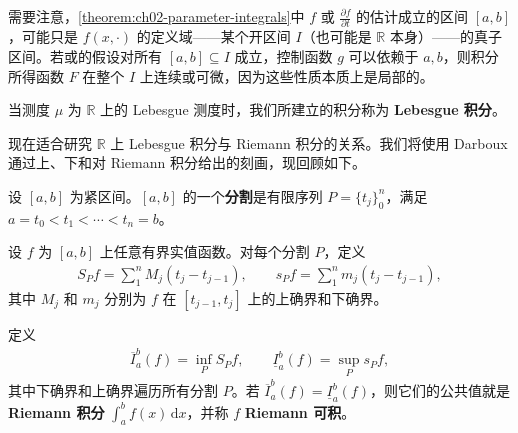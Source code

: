\documentclass[../../main.tex]{subfiles}%
\begin{document}
\begin{remark}
需要注意，\cref{theorem:ch02-parameter-integrals}中 $f$ 或 $\frac{\partial f}{\partial t}$ 的估计成立的区间 $[a,b]$，可能只是 $f(x,\cdot)$ 的定义域——某个开区间 $I$（也可能是 $\mathbb{R}$ 本身）——的真子区间。若或的假设对所有 $[a,b]\subseteq I$ 成立，控制函数 $g$ 可以依赖于 $a,b$，则积分所得函数 $F$ 在整个 $I$ 上连续或可微，因为这些性质本质上是局部的。
\end{remark}
\begin{definition}[Lebesgue 积分]\label{definition:ch02-lebesgue-integral}
当测度 $\mu$ 为 $\mathbb{R}$ 上的 Lebesgue 测度时，我们所建立的积分称为 \textbf{Lebesgue 积分}。
\end{definition}
现在适合研究 $\mathbb{R}$ 上 Lebesgue 积分与 Riemann 积分的关系。我们将使用 Darboux 通过上、下和对 Riemann 积分给出的刻画，现回顾如下。
\begin{definition}[区间的分割]\label{definition:ch02-interval-partition}
设 $[a,b]$ 为紧区间。$[a,b]$ 的一个\textbf{分割}是有限序列 $P=\{t_j\}_0^n$，满足 $a=t_0<t_1<\cdots<t_n=b$。
\end{definition}
\begin{definition}[上和与下和]\label{definition:ch02-darboux-sums}
设 $f$ 为 $[a,b]$ 上任意有界实值函数。对每个分割 $P$，定义
\begin{align*}
S_Pf=\sum_1^n M_j(t_j-t_{j-1}),\qquad
s_Pf=\sum_1^n m_j(t_j-t_{j-1}),
\end{align*}
其中 $M_j$ 和 $m_j$ 分别为 $f$ 在 $[t_{j-1},t_j]$ 上的上确界和下确界。
\end{definition}
\begin{definition}[Riemann 积分]\label{definition:ch02-riemann-integral}
定义
\begin{align*}
\overline{I}_a^b(f)=\inf_P S_Pf,\qquad
\underline{I}_a^b(f)=\sup_P s_Pf,
\end{align*}
其中下确界和上确界遍历所有分割 $P$。若 $\overline{I}_a^b(f)=\underline{I}_a^b(f)$，则它们的公共值就是 \textbf{Riemann 积分} $\int_a^b f(x)\,\mathrm{d}x$，并称 $f$ \textbf{Riemann 可积}。
\end{definition}
\end{document}
